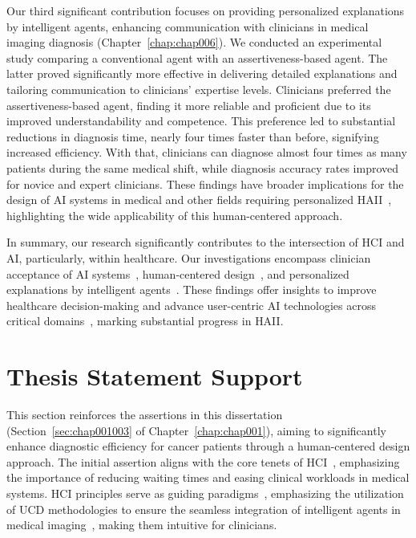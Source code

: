 \textcolor{revised}{Our third significant contribution focuses on providing personalized explanations by intelligent agents, enhancing communication with clinicians in medical imaging diagnosis (Chapter~\ref{chap:chap006}).
We conducted an experimental study comparing a conventional agent with an assertiveness-based agent.
The latter proved significantly more effective in delivering detailed explanations and tailoring communication to clinicians' expertise levels.
Clinicians preferred the assertiveness-based agent, finding it more reliable and proficient due to its improved understandability and competence.
This preference led to substantial reductions in diagnosis time, nearly four times faster than before, signifying increased efficiency.
With that, clinicians can diagnose almost four times as many patients during the same medical shift, while diagnosis accuracy rates improved for novice and expert clinicians.
These findings have broader implications for the design of \ac{AI} systems in medical and other fields requiring personalized \ac{HAII}~\cite{PELAU2021106855, 10.1145/3555171}, highlighting the wide applicability of this human-centered approach.}

\textcolor{revised}{In summary, our research significantly contributes to the intersection of \ac{HCI} and \ac{AI}, particularly, within healthcare.
Our investigations encompass clinician acceptance of \ac{AI} systems~\cite{HUA2024102698}, human-centered design~\cite{10.1145/3313831.3376718}, and personalized explanations by intelligent agents~\cite{OPRESCU202253, 10.1145/3449190}.
These findings offer insights to improve healthcare decision-making and advance user-centric \ac{AI} technologies across critical domains~\cite{10.1145/3274463}, marking substantial progress in \ac{HAII}.}

\section{Thesis Statement Support}
\label{sec:chap007002}

\textcolor{revised}{This section reinforces the assertions in this dissertation (Section~\ref{sec:chap001003} of Chapter~\ref{chap:chap001}), aiming to significantly enhance diagnostic efficiency for cancer patients through a human-centered design approach.
The initial assertion aligns with the core tenets of \ac{HCI}~\cite{PELAU2021106855}, emphasizing the importance of reducing waiting times and easing clinical workloads in medical systems.
\ac{HCI} principles serve as guiding paradigms~\cite{10.1145/3290605.3300233}, emphasizing the utilization of \ac{UCD} methodologies to ensure the seamless integration of intelligent agents in medical imaging~\cite{10.1145/3290605.3300234, 10.1145/3313831.3376718}, making them intuitive for clinicians.}

